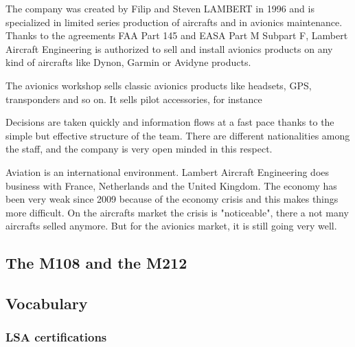 \documentclass[11pt,a4paper]{report}
\begin{document}

The company was created by Filip and Steven LAMBERT in 1996 and is specialized in limited series production of aircrafts and in avionics maintenance. Thanks to the agreements FAA Part 145 and EASA Part M Subpart F, Lambert Aircraft Engineering is authorized to sell and install avionics products on any kind of aircrafts like Dynon, Garmin or Avidyne products.

\bigskip

The avionics workshop sells classic avionics products like headsets, GPS, transponders and so on. It sells pilot accessories, for instance %

\bigskip

Decisions are taken quickly and information flows at a fast pace thanks to the simple but effective structure of the team.  There are different nationalities among the staff, and the company is very open minded in this respect.

\bigskip

Aviation is an international environment. Lambert Aircraft Engineering does business with France, Netherlands and the United Kingdom. The economy has been very weak since 2009 because of the economy crisis and this makes things more difficult. On the aircrafts market the crisis is "noticeable", there a not many aircrafts selled anymore. But for the avionics market, it is still going very well.

\subsection{The M108 and the M212}



\subsection{Vocabulary} %
\subsubsection{LSA certifications}
\end{document}
